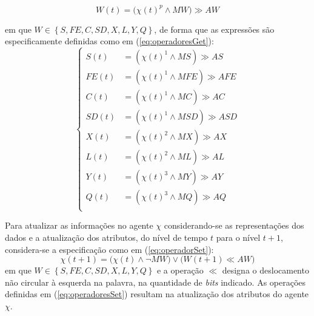 \begin{equation}
 W(t)=\big(\chi(t)^p\wedge MW\big)\gg AW
 \label{eq:operadorGet}
\end{equation}

em que $W \in \left\{S, FE, C, SD, X, L, Y, Q\right\}$, de forma que as expressões são especificamente definidas como em (\ref{eq:operadoresGet}):
\begin{equation}
 \begin{cases}
 S(t)  &= (\chi(t)^1\wedge MS)  \gg AS  \\
 FE(t) &= (\chi(t)^1\wedge MFE) \gg AFE \\
 C(t)  &= (\chi(t)^1\wedge MC ) \gg AC  \\
 SD(t) &= (\chi(t)^1\wedge MSD) \gg ASD \\
 
 X(t)  &= (\chi(t)^2\wedge MX)  \gg AX  \\
 L(t)  &= (\chi(t)^2\wedge ML)  \gg AL  \\

 Y(t)  &= (\chi(t)^3\wedge MY)  \gg AY  \\
 Q(t)  &= (\chi(t)^3\wedge MQ)  \gg AQ  \\
 \end{cases}
 \label{eq:operadoresGet}
\end{equation}

Para atualizar as informações no agente $\chi$ considerando-se as representações dos dados e a atualização dos atributos, do nível de tempo $t$ para o nível $t+1$, considera-se a especificação como em (\ref{eq:operadorSet}):
\begin{equation}
 \chi(t+1)=\big(\chi(t)\wedge \neg MW\big)\vee \big(W(t+1) \ll AW\big)
 \label{eq:operadorSet}
\end{equation}
em que $W \in \left\{S, FE, C, SD, X, L, Y, Q\right\}$ e a operação $\ll$ designa o deslocamento não circular à esquerda na palavra, na quantidade de \textit{bits} indicado. As operações definidas em (\ref{eq:operadoresSet}) resultam na atualização dos atributos do agente $\chi$.

